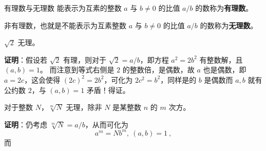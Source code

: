 
\begin{definition}{有理数与无理数}
能表示为互素的整数 $a$ 与 $b\neq 0$ 的比值 $a/b$ 的数称为\textbf{有理数}。

非有理数，也就是不能表示为互素整数 $a$ 与 $b\neq 0$ 的比值 $a/b$ 的数称为\textbf{无理数}。
\end{definition}

\begin{theorem}{}
$\sqrt{2}$ 无理。
\end{theorem}
\textbf{证明}：假设若 $\sqrt 2$ 有理，则对于 $\sqrt 2 = a/b$，即方程 $a^2=2b^2$ 有整数解，且 $(a, b) = 1$。
而注意到等式右侧是 $2$ 的整数倍，是偶数，故 $a$ 也是偶数，即 $a=2c$，这会使得 $(2c)^2 = 2b^2$，可化为 $2c^2=b^2$，同样是的 $b$ 是偶数而 $a, b$ 就有公约数 $2$，与 $(a, b) = 1$ 矛盾！得证。

\begin{theorem}{}
对于整数 $N$，$\sqrt[m]{N}$ 无理，除非 $N$ 是某整数 $n$ 的 $m$ 次方。
\end{theorem}
\textbf{证明}：仍考虑 $\sqrt[m]{N} = a/b$，从而可化为
\begin{equation}
a^m = N b^m, ~ (a, b) = 1 ~,
\end{equation}
而
